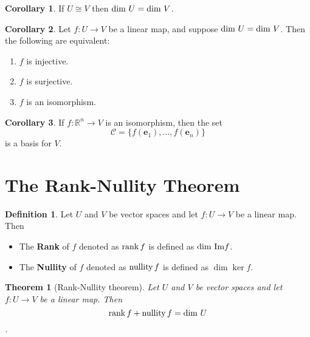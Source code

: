 \documentclass[11pt,a4paper]{article}
\newcommand\R{\mathbb{R}}
\newcommand\Cf{\mathcal{C}}
\newcommand\eb{\mathbf{e}}
\newcommand\im{\textup{Im}}
\newcommand\rank{\textup{rank}}
\newcommand\nullity{\textup{nullity}}
\newtheorem{theorem}{Theorem}
\theoremstyle{definition}
\newtheorem{definition}{Definition}
\newtheorem{corollary}{Corollary}
\begin{document}
\begin{corollary}
    If $ U \cong V $ then $ \textup{dim } U = \textup{dim } V $.
\end{corollary}

\begin{corollary}
    Let $ f : U \to V $ be a linear map, and suppose $ \textup{dim } U = \textup{dim } V $. Then the following are equivalent:
    \begin{enumerate}
        \item $ f $ is injective.
        \item $ f $ is surjective. 
        \item $ f $ is an isomorphism. 
    \end{enumerate}
\end{corollary}

\begin{corollary}
    If $ f : \R^n \to V $ is an isomorphism, then the set
    \[ \Cf = \{ f(\eb_1), ..., f(\eb_n)\}\]
    is a basis for $ V $.
\end{corollary}

\section{The Rank-Nullity Theorem}
\begin{definition}
    Let $ U $ and $ V $ be vector spaces and let $ f : U \to V $ be a linear map. Then
    \begin{itemize}
        \item The \textbf{Rank} of $ f $ denoted as $\rank \, f$ is defined as $ \textup{dim } \im f $.
        \item The \textbf{Nullity} of $ f $ denoted as $\nullity \, f$ is defined as $ \dim \ker f $.
    \end{itemize}
\end{definition}

\begin{theorem}[Rank-Nullity theorem]
    Let $ U $ and $ V $ be vector spaces and let $ f : U \to V $ be a linear map. Then
    \[ \rank \, f + \nullity \, f = \dim \, U\].
\end{theorem}
\end{document}
